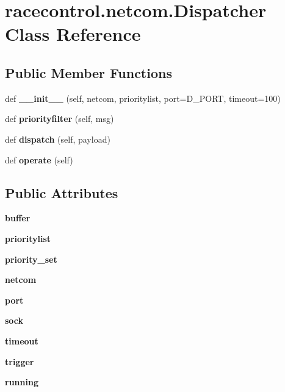 \section{racecontrol.\+netcom.\+Dispatcher Class Reference}
\label{classracecontrol_1_1netcom_1_1Dispatcher}
\subsection*{Public Member Functions}
\begin{DoxyCompactItemize}
\item 
def {\bfseries \+\_\+\+\_\+init\+\_\+\+\_\+} (self, netcom, prioritylist, port=D\+\_\+\+P\+O\+RT, timeout=100)\label{classracecontrol_1_1netcom_1_1Dispatcher_a40d53ebebdec4c628392f666ff14a4f4}

\item 
def {\bf priorityfilter} (self, msg)
\item 
def {\bf dispatch} (self, payload)
\item 
def {\bf operate} (self)
\end{DoxyCompactItemize}
\subsection*{Public Attributes}
\begin{DoxyCompactItemize}
\item 
{\bfseries buffer}\label{classracecontrol_1_1netcom_1_1Dispatcher_a1b53b2fd4b2dbde0e3cc31a5416fbd2e}

\item 
{\bfseries prioritylist}\label{classracecontrol_1_1netcom_1_1Dispatcher_a5cafa237d7e25d70d330cc7a12f6c93a}

\item 
{\bfseries priority\+\_\+set}\label{classracecontrol_1_1netcom_1_1Dispatcher_a71685a4d695523d4485bda704f53ede9}

\item 
{\bfseries netcom}\label{classracecontrol_1_1netcom_1_1Dispatcher_a7880baacf7b0928435ac9fe2088ac0ed}

\item 
{\bfseries port}\label{classracecontrol_1_1netcom_1_1Dispatcher_a93f7c9e98ee6b191761b7f04ddf26261}

\item 
{\bfseries sock}\label{classracecontrol_1_1netcom_1_1Dispatcher_ac347291950368776556f36686d7c54d1}

\item 
{\bfseries timeout}\label{classracecontrol_1_1netcom_1_1Dispatcher_a0f007223f86688ce9fd62b8d44c428bc}

\item 
{\bfseries trigger}\label{classracecontrol_1_1netcom_1_1Dispatcher_a47286311bec7ca31f504296cc434866e}

\item 
{\bfseries running}\label{classracecontrol_1_1netcom_1_1Dispatcher_a91cf54434cc2b6fe4b66d5d0680e2229}

\end{DoxyCompactItemize}


